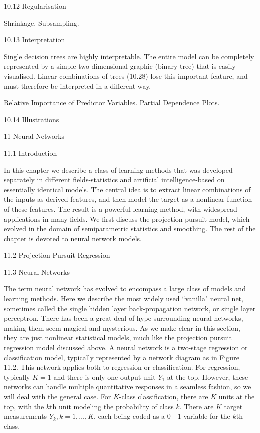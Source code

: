 10.12 Regularisation

Shrinkage. Subsampling.

10.13 Interpretation

Single decision trees are highly interpretable. The entire model can be completely represented by a simple two-dimensional graphic (binary tree) that is easily visualised. Linear combinations of trees (10.28) lose this important feature, and must therefore be interpreted in a different way.

Relative Importance of Predictor Variables. Partial Dependence Plots.

10.14 Illustrations



11 Neural Networks

11.1 Introduction

In this chapter we describe a class of learning methods that was developed separately in different fields-statistics and artificial intelligence-based on essentially identical models. The central idea is to extract linear combinations of the inputs as derived features, and then model the target as a nonlinear function of these features. The result is a powerful learning method, with widespread applications in many fields. We first discuss the projection pursuit model, which evolved in the domain of semiparametric statistics and smoothing. The rest of the chapter is devoted to neural network models.

11.2 Projection Pursuit Regression



11.3 Neural Networks

The term neural network has evolved to encompass a large class of models and learning methods. Here we describe the most widely used ``vanilla" neural net, sometimes called the single hidden layer back-propagation network, or single layer perceptron. There has been a great deal of hype surrounding neural networks, making them seem magical and mysterious. As we make clear in this section, they are just nonlinear statistical models, much like the projection pursuit regression model discussed above. A neural network is a two-stage regression or classification model, typically represented by a network diagram as in Figure 11.2. This network applies both to regression or classification. For regression, typically $K=1$ and there is only one output unit $Y_1$ at the top. However, these networks can handle multiple quantitative responses in a seamless fashion, so we will deal with the general case. For $K$-class classification, there are $K$ units at the top, with the $k$th unit modeling the probability of class $k$. There are $K$ target measurements $Y_k,k=1,\dots ,K$, each being coded as a $0$ - $1$ variable for the $k$th class.

